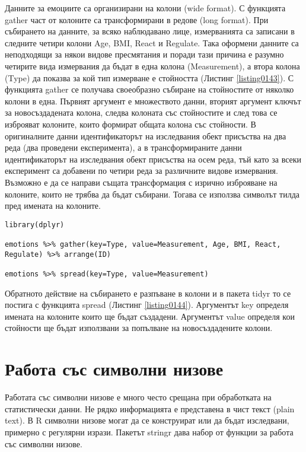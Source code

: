 Данните за емоциите са организирани на колони (wide format). С функцията gather част от колоните са трансформирани в редове (long format). При събирането на данните, за всяко наблюдавано лице, измерванията са записани в следните четири колони Age, BMI, React и Regulate. Така оформени данните са неподходящи за някои видове пресмятания и поради тази причина е разумно четирите вида измервания да бъдат в една колона (Measurement), а втора колона (Type) да показва за кой тип измерване е стойността (Листинг \ref{listing0143}). С функцията gather се получава своеобразно събиране на стойностите от няколко колони в една. Първият аргумент е множеството данни, вторият аргумент ключът за новосъздадената колона, следва колоната със стойностите и след това се изброяват колоните, които формират общата колона със стойности. В оригиналните данни идентификаторът на изследвания обект присъства на два реда (два проведени експеримента), а в трансформираните данни идентификаторът на изследвания обект присъства на осем реда, тъй като за всеки експеримент са добавени по четири реда за различните видове измервания. Възможно е да се направи същата трансформация с изрично изброяване на колоните, които не трябва да бъдат събирани. Тогава се използва символът тилда пред имената на колоните. 

\begin{lstlisting}[caption=Разпъване от редове в колони, label=listing0144]
library(dplyr)

emotions %>% gather(key=Type, value=Measurement, Age, BMI, React, Regulate) %>% arrange(ID)

emotions %>% spread(key=Type, value=Measurement)
\end{lstlisting}

Обратното действие на събирането е разпъване в колони и в пакета tidyr то се постига с функцията spread (Листинг \ref{listing0144}). Аргументът key определя имената на колоните които ще бъдат създадени. Аргументът value определя кои стойности ще бъдат използвани за попълване на новосъздадените колони. 

\section{Работа със символни низове}

Работата със символни низове е много често срещана при обработката на статистически данни. Не рядко информацията е представена в чист текст (plain text). В R символни низове могат да се конструират или да бъдат изследвани, примерно с регулярни изрази. Пакетът stringr дава набор от функции за работа със символни низове.

